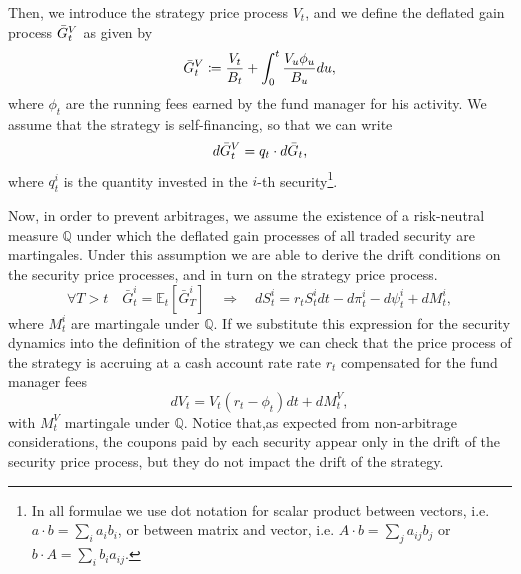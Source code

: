 \documentclass[11pt]{article}
\begin{document}
Then, we introduce the strategy price process $V_t$, and we define the deflated gain process $\Bar{G}_t^V$ as given by
\begin{equation}
    \Bar{G}_t^V \coloneqq \frac{V_t}{B_t} + \int_0^t\frac{V_u\phi_u}{B_u}du,
\end{equation}
where $\phi_t$ are the running fees earned by the fund manager for his activity. We assume that the strategy is self-financing, so that we can write
\begin{equation}
    d\Bar{G}_t^V = q_t \cdot d\bar{G}_t,
\label{eq:self_financing}\end{equation}
where $q_t^i$ is the quantity invested in the $i$-th security\footnote{In all formulae we use dot notation for scalar product between vectors, i.e. $a \cdot b = \sum_i a_i b_i$, or between matrix and vector, i.e. $A \cdot b = \sum_j a_{ij}b_j$ or $b \cdot A = \sum_i b_i a_{ij}$.}.

Now, in order to prevent arbitrages, we assume the existence of a risk-neutral measure $\mathbb{Q}$ under which the deflated gain processes of all traded security are martingales. Under this assumption we are able to derive the drift conditions on the security price processes, and in turn on the strategy price process.
\begin{equation}
    \forall T >t \quad \bar{G}_t^i = \mathbb{E}_t \left[\bar{G}_T^i\right] \quad\Longrightarrow \quad dS_t^i = r_tS_t^idt-d\pi_t^i-d\psi_t^i + dM_t^i,
\label{eq:risk_neutral}\end{equation}
where $M_t^i$ are martingale under $\mathbb{Q}$. If we substitute this expression for the security dynamics into the definition of the strategy we can check that the price process of the strategy is accruing at a cash account rate rate $r_t$ compensated for the fund manager fees
\begin{equation}
    dV_t = V_t(r_t-\phi_t)dt + dM_t^V,
\end{equation}
with $M_t^V$ martingale under $\mathbb{Q}$. Notice that,as expected from non-arbitrage considerations, the coupons paid by each security appear only in the drift of the security price process, but they do not impact the drift of the strategy. 
\end{document}
